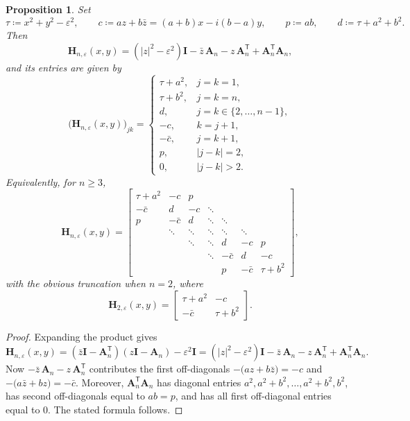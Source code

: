 \documentclass[11pt]{article}
\newtheorem{proposition}[theorem]{Proposition}
\begin{document}
\begin{proposition}\label{prop:explicit-H}
Set
\[
\tau\coloneqq x^2+y^2-\varepsilon^2,
\qquad
c\coloneqq az+b\bar z=(a+b)x-i(b-a)y,
\qquad
p\coloneqq ab,
\qquad
d\coloneqq \tau+a^2+b^2.
\]
Then
\[
\mathbf{H}_{n,\varepsilon}(x,y)
=(|z|^2-\varepsilon^2)\mathbf{I}-\bar z\,\mathbf{A}_n-z\,\mathbf{A}_n^{\mathsf{T}}+\mathbf{A}_n^{\mathsf{T}}\mathbf{A}_n,
\]
and its entries are given by
\[
\bigl(\mathbf{H}_{n,\varepsilon}(x,y)\bigr)_{jk}
=
\begin{cases}
\tau+a^2, & j=k=1,\\
\tau+b^2, & j=k=n,\\
d, & j=k\in\{2,\dots,n-1\},\\
-c, & k=j+1,\\
-\bar c, & j=k+1,\\
p, & |j-k|=2,\\
0, & |j-k|>2.
\end{cases}
\]
Equivalently, for $n\ge 3$,
\[
\mathbf{H}_{n,\varepsilon}(x,y)=
\begin{bmatrix}
\tau+a^2 & -c & p \\
-\bar c & d & -c & \ddots \\
p & -\bar c & d & \ddots & \ddots \\
& \ddots & \ddots & \ddots & \ddots & \ddots \\
&& \ddots & \ddots & d & -c & p \\
&&& \ddots & -\bar c & d & -c \\
&&&& p & -\bar c & \tau+b^2
\end{bmatrix},
\]
with the obvious truncation when $n=2$, where
\[
\mathbf{H}_{2,\varepsilon}(x,y)=
\begin{bmatrix}
\tau+a^2 & -c \\
-\bar c & \tau+b^2
\end{bmatrix}.
\]
\end{proposition}

\begin{proof}
Expanding the product gives
\[
\mathbf{H}_{n,\varepsilon}(x,y)
=(\bar z\mathbf{I}-\mathbf{A}_n^{\mathsf{T}})(z\mathbf{I}-\mathbf{A}_n)-\varepsilon^2\mathbf{I}
=(|z|^2-\varepsilon^2)\mathbf{I}-\bar z\,\mathbf{A}_n-z\,\mathbf{A}_n^{\mathsf{T}}+\mathbf{A}_n^{\mathsf{T}}\mathbf{A}_n.
\]
Now $-\bar z\,\mathbf{A}_n-z\,\mathbf{A}_n^{\mathsf{T}}$ contributes the first off-diagonals
$-\bigl(az+b\bar z\bigr)=-c$ and $-\bigl(a\bar z+bz\bigr)=-\bar c$.
Moreover, $\mathbf{A}_n^{\mathsf{T}}\mathbf{A}_n$ has diagonal entries
$a^2,a^2+b^2,\dots,a^2+b^2,b^2$, has second off-diagonals equal to $ab=p$,
and has all first off-diagonal entries equal to $0$. The stated formula follows.
\end{proof}
\end{document}
